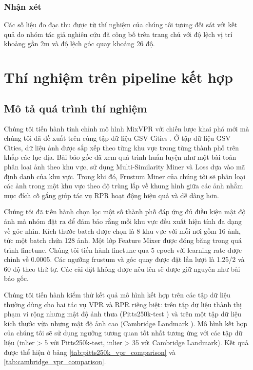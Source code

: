 \subsubsection*{Nhận xét}

Các số liệu đo đạc thu được từ thí nghiệm của chúng tôi tương đối sát với kết quả do nhóm tác giả nghiên cứu đã công bố trên trang chủ với độ lệch vị trí khoảng gần 2m và độ lệch góc quay khoảng 26 độ.

\section{Thí nghiệm trên pipeline kết hợp}
\subsection*{Mô tả quá trình thí nghiệm}

Chúng tôi tiến hành tinh chỉnh mô hình MixVPR \cite{alibey2023mixvpr} với chiến lược khai phá mới mà chúng tôi đã đề xuất trên cùng tập dữ liệu GSV-Cities \cite{Ali_bey_2022}. Ở tập dữ liệu GSV-Cities, dữ liệu ảnh được sắp xếp theo từng khu vực trong từng thành phố trên khắp các lục địa. Bài báo gốc đã xem quá trình huấn luyện như một bài toán phân loại ảnh theo khu vực, sử dụng Multi-Similarity Miner và Loss \cite{wang2019multi} dựa vào mã định danh của khu vực. Trong khi đó, Frustum Miner của chúng tôi sẽ phân loại các ảnh trong một khu vực theo độ trùng lắp về khung hình giữa các ảnh nhằm mục đích cố gắng giúp tác vụ RPR hoạt động hiệu quả và dễ dàng hơn.

Chúng tôi đã tiến hành chọn lọc một số thành phố đáp ứng đủ điều kiện mật độ ảnh mà nhóm đặt ra để đảm bảo rằng mỗi khu vực đều xuất hiện tính đa dạng về góc nhìn. Kích thước batch được chọn là 8 khu vực với mỗi nơi gồm 16 ảnh, tức một batch chứa 128 ảnh. Một lớp Feature Mixer được đóng băng trong quá trình finetune. Chúng tôi tiến hành finetune qua 5 epoch với learning rate được chỉnh về 0.0005. Các ngưỡng frustum và góc quay được đặt lần lượt là 1.25/2 và 60 độ theo thứ tự. Các cài đặt không được nêu lên sẽ được giữ nguyên như bài báo gốc.

Chúng tôi tiến hành kiểm thử kết quả mô hình kết hợp trên các tập dữ liệu thường dùng cho hai tác vụ VPR và RPR riêng biệt: trên tập dữ liệu thành thị phạm vi rộng nhưng mật độ ảnh thưa (Pitts250k-test \cite{6618963}) và trên một tập dữ liệu kích thước vừa nhưng mật độ ảnh cao (Cambridge Landmark \cite{kendall2016posenet}). Mô hình kết hợp của chúng tôi sẽ sử dụng ngưỡng tương quan tốt nhất tương ứng với các tập dữ liệu (inlier > 5 với Pitts250k-test, inlier > 35 với Cambridge Landmark). Kết quả được thể hiện ở bảng \ref{tab:pitts250k_vpr_comparison} và \ref{tab:cambridge_vpr_comparison}.

